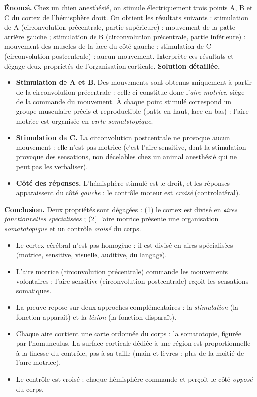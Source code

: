 \documentclass[11pt]{article}
\newcommand{\cle}[1]{{\popxbold\color{popdark}#1}}
\begin{document}
\begin{exoresolu}
\textbf{Énoncé.} Chez un chien anesthésié, on stimule électriquement trois points A, B et C du cortex de l'hémisphère droit. On obtient les résultats suivants : stimulation de A (circonvolution précentrale, partie supérieure) : mouvement de la patte arrière gauche ; stimulation de B (circonvolution précentrale, partie inférieure) : mouvement des muscles de la face du côté gauche ; stimulation de C (circonvolution postcentrale) : aucun mouvement. Interprète ces résultats et dégage deux propriétés de l'organisation corticale.
\tcblower
\textbf{Solution détaillée.}
\begin{itemize}
\item \textbf{Stimulation de A et B.} Des mouvements sont obtenus uniquement à partir de la circonvolution précentrale : celle-ci constitue donc l'\emph{aire motrice}, siège de la commande du mouvement. À chaque point stimulé correspond un groupe musculaire précis et reproductible (patte en haut, face en bas) : l'aire motrice est organisée en \emph{carte somatotopique}.
\item \textbf{Stimulation de C.} La circonvolution postcentrale ne provoque aucun mouvement : elle n'est pas motrice (c'est l'aire sensitive, dont la stimulation provoque des sensations, non décelables chez un animal anesthésié qui ne peut pas les verbaliser).
\item \textbf{Côté des réponses.} L'hémisphère stimulé est le droit, et les réponses apparaissent du côté \emph{gauche} : le contrôle moteur est \emph{croisé} (controlatéral).
\end{itemize}
\textbf{Conclusion.} Deux propriétés sont dégagées : (1) le cortex est divisé en \emph{aires fonctionnelles spécialisées} ; (2) l'aire motrice présente une organisation \emph{somatotopique} et un contrôle \emph{croisé} du corps.
\end{exoresolu}

\begin{aretenir}
\begin{itemize}
\item Le cortex cérébral n'est pas homogène : il est divisé en \cle{aires spécialisées} (motrice, sensitive, visuelle, auditive, du langage).
\item L'\cle{aire motrice} (circonvolution précentrale) commande les mouvements volontaires ; l'\cle{aire sensitive} (circonvolution postcentrale) reçoit les sensations somatiques.
\item La preuve repose sur deux approches complémentaires : la \emph{stimulation} (la fonction apparaît) et la \emph{lésion} (la fonction disparaît).
\item Chaque aire contient une carte ordonnée du corps : la \cle{somatotopie}, figurée par l'\cle{homunculus}. La surface corticale dédiée à une région est proportionnelle à la finesse du contrôle, pas à sa taille (main et lèvres : plus de la moitié de l'aire motrice).
\item Le contrôle est \cle{croisé} : chaque hémisphère commande et perçoit le côté \emph{opposé} du corps.
\end{itemize}
\end{aretenir}
\end{document}
